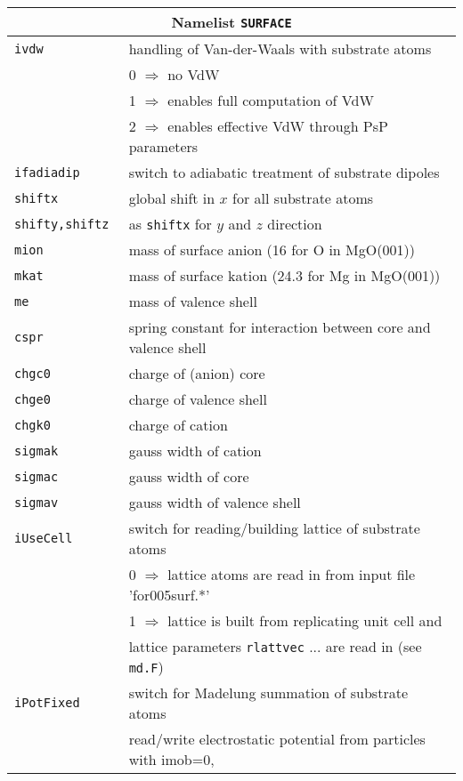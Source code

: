 \documentclass[12pt]{article}
\begin{document}
\begin{enumerate}
\begin{tabular}{ll}
\hline
\multicolumn{2}{c}{Namelist {\tt SURFACE}} in {\tt for005.<name>} \\
\hline
{\tt ivdw} & handling of Van-der-Waals with substrate atoms\\
    & 0 $\Longrightarrow$ no VdW\\
    & 1 $\Longrightarrow$ enables full computation of VdW\\
    & 2 $\Longrightarrow$ enables effective VdW through PsP parameters\\
{\tt ifadiadip        }& switch to adiabatic treatment of substrate dipoles\\
{\tt shiftx           }& global shift in $x$ for all substrate atoms\\
{\tt shifty,shiftz    }& as {\tt shiftx} for $y$ and $z$ direction\\
{\tt mion             }& mass of surface anion (16 for O in MgO(001))\\
{\tt mkat             }& mass of surface kation (24.3 for Mg in MgO(001))\\
{\tt me               }& mass of valence shell\\
{\tt cspr             }& spring constant for interaction between core and valence shell\\
{\tt chgc0            }& charge of (anion) core\\
{\tt chge0            }& charge of valence shell\\
{\tt chgk0            }& charge of cation\\
{\tt sigmak           }& gauss width of cation\\
{\tt sigmac           }& gauss width of core\\
{\tt sigmav           }& gauss width of valence shell\\
{\tt iUseCell         }& switch for reading/building lattice of
                          substrate atoms\\
   & 0 $\Longrightarrow$ lattice atoms are read in from input file 'for005surf.*'\\
   & 1 $\Longrightarrow$ lattice is built from replicating unit cell and\\
   &\qquad lattice parameters {\tt rlattvec} ... are
                          read in (see {\tt md.F})\\
{\tt iPotFixed        }& switch for Madelung summation of substrate atoms\\
   & read/write electrostatic potential from particles with imob=0,\\

\end{tabular}
\end{enumerate}
\end{document}
